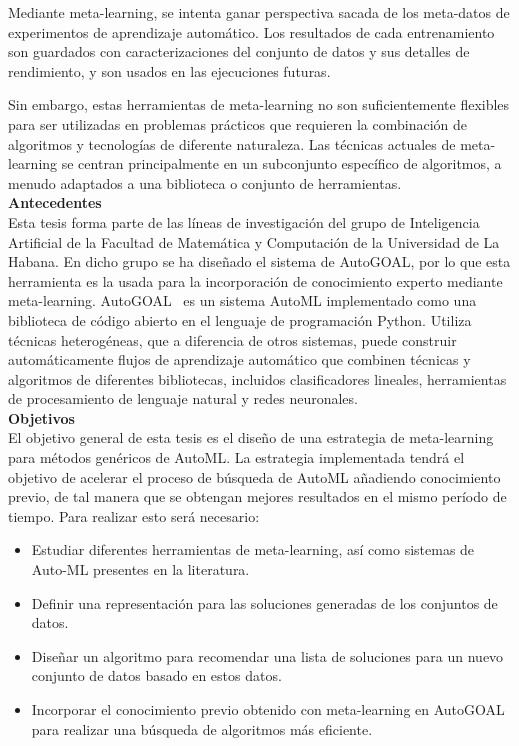 Mediante meta-learning, se intenta ganar perspectiva sacada de los meta-datos
de experimentos de aprendizaje automático. Los resultados de cada entrenamiento
son guardados con caracterizaciones del conjunto de datos y sus detalles de
rendimiento, y son usados en las ejecuciones futuras.

Sin embargo, estas herramientas de meta-learning no son suficientemente
flexibles para ser utilizadas en problemas prácticos que requieren la
combinación de algoritmos y tecnologías de diferente naturaleza. Las técnicas
actuales de meta-learning se centran principalmente en un subconjunto
específico de algoritmos, a menudo adaptados a una biblioteca o conjunto de
herramientas.\\

\textbf{\Large Antecedentes}\\

Esta tesis forma parte de las líneas de investigación del grupo de Inteligencia
Artificial de la Facultad de Matemática y Computación de la Universidad de La
Habana. En dicho grupo se ha diseñado el sistema de AutoGOAL, por lo que esta
herramienta es la usada para la incorporación de conocimiento experto mediante
meta-learning. AutoGOAL~ es un sistema AutoML implementado
como una biblioteca de código abierto en el lenguaje de programación Python.
Utiliza técnicas heterogéneas, que a diferencia de otros sistemas, puede
construir automáticamente flujos de aprendizaje automático que combinen
técnicas y algoritmos de diferentes bibliotecas, incluidos clasificadores
lineales, herramientas de procesamiento de lenguaje natural y redes neuronales.\\

\textbf{\Large Objetivos}\\

El objetivo general de esta tesis es el diseño de una estrategia de
meta-learning para métodos genéricos de AutoML. La estrategia implementada
tendrá el objetivo de acelerar el proceso de búsqueda de AutoML añadiendo
conocimiento previo, de tal manera que se obtengan mejores resultados en el
mismo período de tiempo. Para realizar esto será necesario:

\begin{itemize}
    \item Estudiar diferentes herramientas de meta-learning, así como sistemas
    de Auto-ML presentes en la literatura.
    \item Definir una representación para las soluciones generadas de los
    conjuntos de datos.
    \item Diseñar un algoritmo para recomendar una lista de soluciones para un
    nuevo conjunto de datos basado en estos datos.
    \item Incorporar el conocimiento previo obtenido con meta-learning en
    AutoGOAL para realizar una búsqueda de algoritmos más eficiente.\\
    
\end{itemize}

